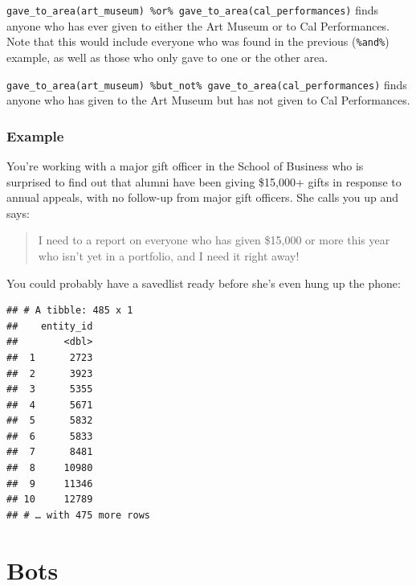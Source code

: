 \documentclass[]{book}
\newenvironment{Shaded}{\begin{snugshade}}{\end{snugshade}}
\newcommand{\DataTypeTok}[1]{\textcolor[rgb]{0.13,0.29,0.53}{#1}}
\newcommand{\DecValTok}[1]{\textcolor[rgb]{0.00,0.00,0.81}{#1}}
\newcommand{\KeywordTok}[1]{\textcolor[rgb]{0.13,0.29,0.53}{\textbf{#1}}}
\newcommand{\NormalTok}[1]{#1}
\newcommand{\OperatorTok}[1]{\textcolor[rgb]{0.81,0.36,0.00}{\textbf{#1}}}
\newcommand{\StringTok}[1]{\textcolor[rgb]{0.31,0.60,0.02}{#1}}
\begin{document}
\texttt{gave\_to\_area(art\_museum)\ \%or\%\ gave\_to\_area(cal\_performances)} finds anyone who has ever given to either the Art Museum or to Cal Performances. Note that this would include everyone who was found in the previous (\texttt{\%and\%}) example, as well as those who only gave to one or the other area.

\texttt{gave\_to\_area(art\_museum)\ \%but\_not\%\ gave\_to\_area(cal\_performances)} finds anyone who has given to the Art Museum but has not given to Cal Performances.

\hypertarget{example}{%
\section{Example}\label{example}}

You're working with a major gift officer in the School of Business who is surprised to find out that alumni have been giving \$15,000+ gifts in response to annual appeals, with no follow-up from major gift officers. She calls you up and says:

\begin{quote}
I need to a report on everyone who has given \$15,000 or more this year who isn't yet in a portfolio, and I need it right away!
\end{quote}

You could probably have a savedlist ready before she's even hung up the phone:

\begin{Shaded}
\end{Shaded}

\begin{verbatim}
## # A tibble: 485 x 1
##    entity_id
##        <dbl>
##  1      2723
##  2      3923
##  3      5355
##  4      5671
##  5      5832
##  6      5833
##  7      8481
##  8     10980
##  9     11346
## 10     12789
## # … with 475 more rows
\end{verbatim}

\hypertarget{part-bots}{%
\part{Bots}\label{part-bots}}
\end{document}

